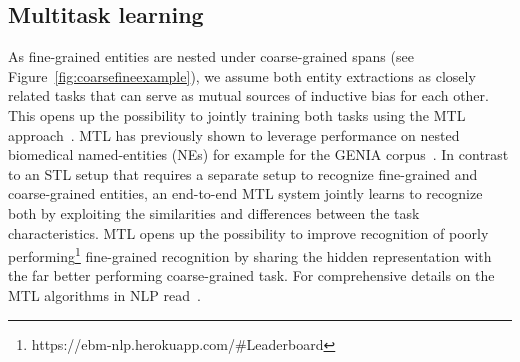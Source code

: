 \documentclass[runningheads]{llncs}
\begin{document}
\subsection{Multitask learning}
\label{subsec:mtl}
%
As fine-grained entities are nested under coarse-grained spans (see Figure~\ref{fig:coarsefineexample}), we assume both entity extractions as closely related tasks that can serve as mutual sources of inductive bias for each other.
This opens up the possibility to jointly training both tasks using the MTL approach~\cite{caruana1997multitask,ruder2017overview}.
MTL has previously shown to leverage performance on nested biomedical named-entities (NEs) for example for the GENIA corpus~\cite{fei2020dispatched}.
In contrast to an STL setup that requires a separate setup to recognize fine-grained and coarse-grained entities, an end-to-end MTL system jointly learns to recognize both by exploiting the similarities and differences between the task characteristics.
MTL opens up the possibility to improve recognition of poorly performing\footnote{https://ebm-nlp.herokuapp.com/\#Leaderboard} fine-grained recognition by sharing the hidden representation with the far better performing coarse-grained task.
For comprehensive details on the MTL algorithms in NLP read~\cite{ruder2017overview}.
\end{document}
